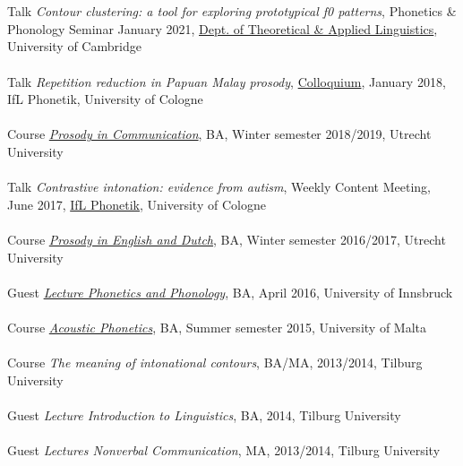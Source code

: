 \documentclass[a4paper,11pt]{article}
\begin{document}
\section*{}
Talk \textit{Contour clustering: a tool for exploring prototypical f0 patterns}, Phonetics \& Phonology Seminar January 2021, \href{https://www.mmll.cam.ac.uk/dtal}{Dept. of Theoretical \& Applied Linguistics}, University of Cambridge\\\\
Talk \textit{Repetition reduction in Papuan Malay prosody}, \href{https://ifl.phil-fak.uni-koeln.de/phonetik/forschung/kolloquien/forschungskolloquium-ws-17-18}{Colloquium}, January 2018, IfL Phonetik, University of Cologne\\\\
Course \href{https://osiris.uu.nl/osiris_student_uuprd/OnderwijsCatalogusSelect.do?selectie=cursus&collegejaar=2018&cursus=EN3V18008}{\textit{Prosody in Communication}}, BA, Winter semester 2018/2019, Utrecht University\\\\
Talk \textit{Contrastive intonation: evidence from autism}, Weekly Content Meeting, June 2017, \href{https://ifl.phil-fak.uni-koeln.de/phonetik}{IfL Phonetik}, University of Cologne\\\\
Course \href{https://www.osiris.universiteitutrecht.nl/osistu_ospr/OnderwijsCatalogusSelect.do?selectie=cursus&collegejaar=2016&cursus=EN3V14102}{\textit{Prosody in English and Dutch}}, BA, Winter semester 2016/2017, Utrecht University\\\\
Guest \href{http://www.uibk.ac.at/studium/angebot/ba-sprachwissenschaft/}{\textit{Lecture Phonetics and Phonology}}, BA, April 2016, University of Innsbruck\\\\
Course \href{http://www.um.edu.mt/linguistics/studyunit/LIN2099}{\textit{Acoustic Phonetics}}, BA, Summer semester 2015, University of Malta\\\\
Course \textit{The meaning of intonational contours}, BA/MA, 2013/2014, Tilburg University\\\\
Guest \textit{Lecture Introduction to Linguistics}, BA, 2014, Tilburg University\\\\
Guest \textit{Lectures Nonverbal Communication}, MA, 2013/2014, Tilburg University\\\\
\end{document}

